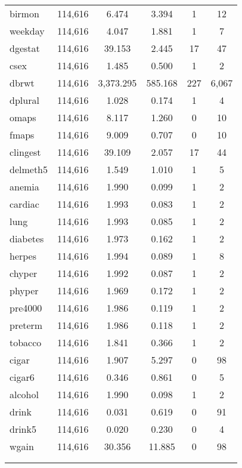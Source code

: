 \documentclass{article}
\begin{document}
\begin{table}[!htbp]
\begin{tabular}{@{\extracolsep{5pt}}lccccc}
birmon & 114,616 & 6.474 & 3.394 & 1 & 12 \\ 
weekday & 114,616 & 4.047 & 1.881 & 1 & 7 \\ 
dgestat & 114,616 & 39.153 & 2.445 & 17 & 47 \\ 
csex & 114,616 & 1.485 & 0.500 & 1 & 2 \\ 
dbrwt & 114,616 & 3,373.295 & 585.168 & 227 & 6,067 \\ 
dplural & 114,616 & 1.028 & 0.174 & 1 & 4 \\ 
omaps & 114,616 & 8.117 & 1.260 & 0 & 10 \\ 
fmaps & 114,616 & 9.009 & 0.707 & 0 & 10 \\ 
clingest & 114,616 & 39.109 & 2.057 & 17 & 44 \\ 
delmeth5 & 114,616 & 1.549 & 1.010 & 1 & 5 \\ 
anemia & 114,616 & 1.990 & 0.099 & 1 & 2 \\ 
cardiac & 114,616 & 1.993 & 0.083 & 1 & 2 \\ 
lung & 114,616 & 1.993 & 0.085 & 1 & 2 \\ 
diabetes & 114,616 & 1.973 & 0.162 & 1 & 2 \\ 
herpes & 114,616 & 1.994 & 0.089 & 1 & 8 \\ 
chyper & 114,616 & 1.992 & 0.087 & 1 & 2 \\ 
phyper & 114,616 & 1.969 & 0.172 & 1 & 2 \\ 
pre4000 & 114,616 & 1.986 & 0.119 & 1 & 2 \\ 
preterm & 114,616 & 1.986 & 0.118 & 1 & 2 \\ 
tobacco & 114,616 & 1.841 & 0.366 & 1 & 2 \\ 
cigar & 114,616 & 1.907 & 5.297 & 0 & 98 \\ 
cigar6 & 114,616 & 0.346 & 0.861 & 0 & 5 \\ 
alcohol & 114,616 & 1.990 & 0.098 & 1 & 2 \\ 
drink & 114,616 & 0.031 & 0.619 & 0 & 91 \\ 
drink5 & 114,616 & 0.020 & 0.230 & 0 & 4 \\ 
wgain & 114,616 & 30.356 & 11.885 & 0 & 98 \\ 
\hline \\[-1.8ex] 
\normalsize 
\end{tabular} 
\end{table} 
\end{document}
